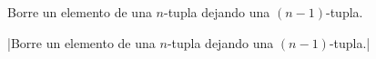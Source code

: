 


\bigskip


Borre un elemento de una $n$-tupla dejando una $(n-1)$-tupla.

\bigskip

\respuestaS |Borre un elemento de una $n$-tupla dejando una
$(n-1)$-tupla.|

\bye

